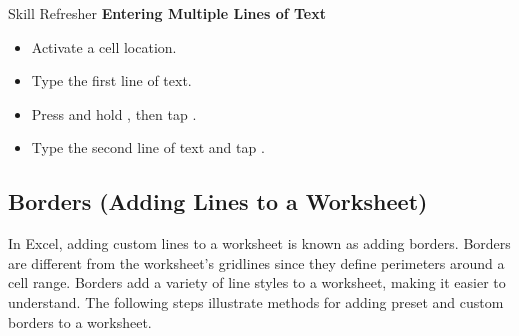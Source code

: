 \begin{center}
	\begin{sklbox}{Skill Refresher}
		\textbf{Entering Multiple Lines of Text}
		\\
		\begin{itemize}
			\setlength{\itemsep}{0pt}
			\setlength{\parskip}{0pt}
			\setlength{\parsep}{0pt}
			
			\item Activate a cell location.
			\item Type the first line of text.
			\item Press and hold , then tap .
			\item Type the second line of text and tap .
			
		\end{itemize}
	\end{sklbox}
\end{center}

\subsection{Borders (Adding Lines to a Worksheet)}

In Excel, adding custom lines to a worksheet is known as adding borders. Borders are different from the worksheet's gridlines since they define perimeters around a cell range. Borders add a variety of line styles to a worksheet, making it easier to understand. The following steps illustrate methods for adding preset and custom borders to a worksheet.

